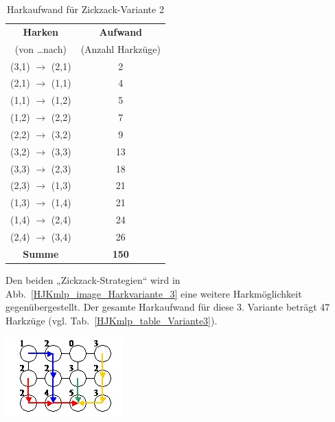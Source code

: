 \documentclass[fontsize=12pt,doubleside,openany,listof=totoc,listof=flat,listof=nochaptergap,numbers=noenddot]{scrbook}
\theoremstyle{style}
\begin{document}
\renewcommand{\arraystretch}{1}
\begin{table}[H]
\caption{Harkaufwand für Zickzack-Variante 2}
\label{HJKmlp_table_ZZVariante2}
\centering 
\begin{scriptsize}
\begin{tabular}{|>{}c|>{}c|}
\hline
\textbf{Harken} & \textbf{Aufwand}\\
(von \ldots nach) & (Anzahl Harkzüge)\\
\hline
(3,1) $\rightarrow$ (2,1) & 2\\
\hline
(2,1) $\rightarrow$ (1,1) & 4\\
\hline
(1,1) $\rightarrow$ (1,2) & 5\\
\hline
(1,2) $\rightarrow$ (2,2) & 7\\
\hline
(2,2) $\rightarrow$ (3,2) & 9\\
\hline
(3,2) $\rightarrow$ (3,3) & 13\\
\hline
(3,3) $\rightarrow$ (2,3) & 18\\
\hline
(2,3) $\rightarrow$ (1,3) & 21\\
\hline
(1,3) $\rightarrow$ (1,4) & 21\\
\hline
(1,4) $\rightarrow$ (2,4) & 24\\
\hline
(2,4) $\rightarrow$ (3,4) & 26\\
\hline
\textbf{Summe}& \textbf{150}\\
\hline
\end{tabular}
\end{scriptsize} 
\end{table}
\renewcommand{\arraystretch}{1}
	 
\noindent Den beiden „Zickzack-Strategien“ wird in Abb.~\ref{HJKmlp_image_Harkvariante_3} eine weitere Harkmöglichkeit gegenübergestellt. Der gesamte Harkaufwand für diese 3. Variante beträgt 47 Harkzüge (vgl. Tab.~\ref{HJKmlp_table_Variante3}).

\begin{center}
\begin{minipage}{\textwidth}
\centerline{\includegraphics[angle=0,scale=0.8]{Figures/Laub/Harkvariante_3.jpg}}
\label{HJKmlp_image_Harkvariante_3}
\end{minipage}
\end{center}
\end{document}

